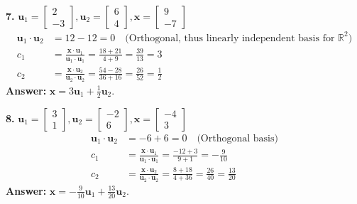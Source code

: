 \documentclass[11pt, letterpaper]{article}
\theoremstyle{definition}
\theoremstyle{remark}
\newcommand{\R}{\mathbb{R}}
\begin{document}
\textbf{7.} $\mathbf{u}_1 = \begin{bmatrix} 2 \\ -3 \end{bmatrix}, \mathbf{u}_2 = \begin{bmatrix} 6 \\ 4 \end{bmatrix}, \mathbf{x} = \begin{bmatrix} 9 \\ -7 \end{bmatrix}$
\begin{align*}
    \mathbf{u}_1 \cdot \mathbf{u}_2 &= 12 - 12 = 0 \quad \text{(Orthogonal, thus linearly independent basis for } \R^2\text{)} \\
    c_1 &= \frac{\mathbf{x} \cdot \mathbf{u}_1}{\mathbf{u}_1 \cdot \mathbf{u}_1} = \frac{18 + 21}{4 + 9} = \frac{39}{13} = 3 \\
    c_2 &= \frac{\mathbf{x} \cdot \mathbf{u}_2}{\mathbf{u}_2 \cdot \mathbf{u}_2} = \frac{54 - 28}{36 + 16} = \frac{26}{52} = \frac{1}{2}
\end{align*}
\textbf{Answer:} $\mathbf{x} = 3\mathbf{u}_1 + \frac{1}{2}\mathbf{u}_2$.

\textbf{8.} $\mathbf{u}_1 = \begin{bmatrix} 3 \\ 1 \end{bmatrix}, \mathbf{u}_2 = \begin{bmatrix} -2 \\ 6 \end{bmatrix}, \mathbf{x} = \begin{bmatrix} -4 \\ 3 \end{bmatrix}$
\begin{align*}
    \mathbf{u}_1 \cdot \mathbf{u}_2 &= -6 + 6 = 0 \quad \text{(Orthogonal basis)} \\
    c_1 &= \frac{\mathbf{x} \cdot \mathbf{u}_1}{\mathbf{u}_1 \cdot \mathbf{u}_1} = \frac{-12 + 3}{9 + 1} = -\frac{9}{10} \\
    c_2 &= \frac{\mathbf{x} \cdot \mathbf{u}_2}{\mathbf{u}_2 \cdot \mathbf{u}_2} = \frac{8 + 18}{4 + 36} = \frac{26}{40} = \frac{13}{20}
\end{align*}
\textbf{Answer:} $\mathbf{x} = -\frac{9}{10}\mathbf{u}_1 + \frac{13}{20}\mathbf{u}_2$.
\end{document}
